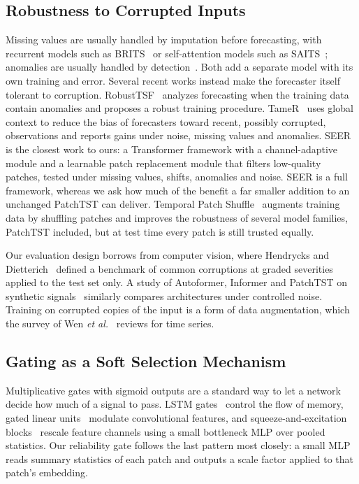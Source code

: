 \subsection{Robustness to Corrupted Inputs}

Missing values are usually handled by imputation before forecasting, with recurrent models such as BRITS~\cite{brits} or self-attention models such as SAITS~\cite{saits}; anomalies are usually handled by detection~\cite{blazquez_anomaly}. Both add a separate model with its own training and error. Several recent works instead make the forecaster itself tolerant to corruption. RobustTSF~\cite{robusttsf} analyzes forecasting when the training data contain anomalies and proposes a robust training procedure. TameR~\cite{tamer} uses global context to reduce the bias of forecasters toward recent, possibly corrupted, observations and reports gains under noise, missing values and anomalies. SEER~\cite{seer} is the closest work to ours: a Transformer framework with a channel-adaptive module and a learnable patch replacement module that filters low-quality patches, tested under missing values, shifts, anomalies and noise. SEER is a full framework, whereas we ask how much of the benefit a far smaller addition to an unchanged PatchTST can deliver. Temporal Patch Shuffle~\cite{tps} augments training data by shuffling patches and improves the robustness of several model families, PatchTST included, but at test time every patch is still trusted equally.

Our evaluation design borrows from computer vision, where Hendrycks and Dietterich~\cite{hendrycks_corrupt} defined a benchmark of common corruptions at graded severities applied to the test set only. A study of Autoformer, Informer and PatchTST on synthetic signals~\cite{synthbench} similarly compares architectures under controlled noise. Training on corrupted copies of the input is a form of data augmentation, which the survey of Wen \textit{et al.}~\cite{tsaug_survey} reviews for time series.

\subsection{Gating as a Soft Selection Mechanism}

Multiplicative gates with sigmoid outputs are a standard way to let a network decide how much of a signal to pass. LSTM gates~\cite{lstm} control the flow of memory, gated linear units~\cite{glu} modulate convolutional features, and squeeze-and-excitation blocks~\cite{senet} rescale feature channels using a small bottleneck MLP over pooled statistics. Our reliability gate follows the last pattern most closely: a small MLP reads summary statistics of each patch and outputs a scale factor applied to that patch's embedding.

